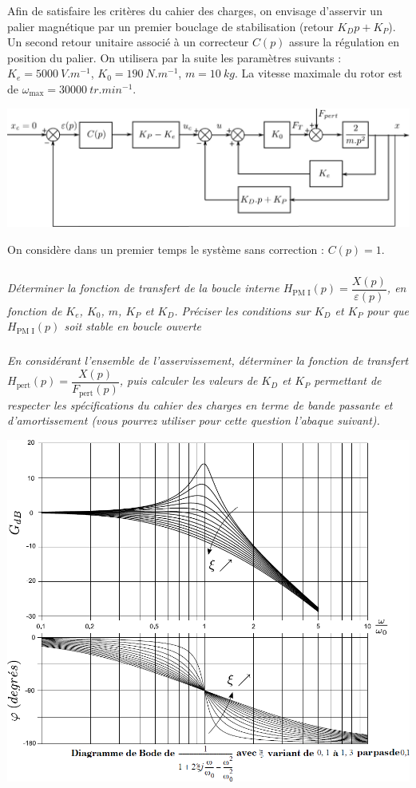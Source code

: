 \documentclass[10pt,fleqn]{article} %
\begin{document}
\begin{multicols}{2}
Afin de satisfaire les critères du cahier des charges, on envisage d'asservir un
palier magnétique par un premier bouclage de stabilisation (retour $K_D p+K_P$).
Un second retour unitaire associé à un correcteur $C(p)$ assure la régulation en
position du palier. On utilisera par la suite les
paramètres suivants : $K_e=\SI{5000}{V.m^{-1}}$, $K_0=\SI{190}{N.m^{-1}}$, $m=\SI{10}{kg}$. La vitesse maximale du rotor est de $\omega_{\text{max}}=\SI{30000}{tr.min^{-1}}$.

\begin{center}
\includegraphics[width=\linewidth]{images/fig_02}
\end{center}

On considère dans un premier temps le système sans correction : $C(p)=1$.

\subparagraph{}\textit{Déterminer la fonction de transfert de la boucle interne $H_{\text{PM I}}(p) = \dfrac{X(p)}{\varepsilon(p)}$, en fonction de $K_e$, $K_0$, $m$, $K_P$ et $K_D$. Préciser les conditions
sur $K_D$ et $K_P$ pour que $H_{\text{PM I}}(p)$ soit stable en boucle ouverte}


\subparagraph{}\textit{En considérant l’ensemble de l’asservissement, déterminer la
fonction de transfert $H_{\text{pert}}(p) = \dfrac{X(p)}{F_{\text{pert}}(p)}$, puis calculer les valeurs de $K_D$ et $K_P$
permettant de respecter les spécifications du cahier des charges en terme de
bande passante et d’amortissement (vous pourrez utiliser pour cette question l’abaque suivant).}

\begin{center}
\includegraphics[width=\linewidth]{images/fig_03}
\end{center}



\end{multicols}
\end{document}
